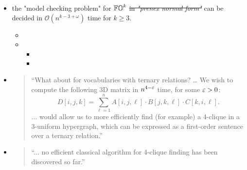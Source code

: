\begin{enumerate}
\begin{yoshiki}
\begin{itemize}
    \item the "model checking problem" for $\mathbb{FO}^{k}$  \sout{in \emph{"prenex normal form"}} can be decided in $\mathcal{O}(n^{k-3 + \omega})$ time for $k \ge 3$.
    \begin{itemize}
      \item {}
      \item {}
      \begin{itemize}
        \item {}
        \item {}
      \end{itemize}
    \end{itemize}
    \end{itemize}

    \begin{itemize}
      \item 
      \cite[Open Problem 2 (p.5)]{williamsFasterDecisionFirstorder2014}
      \begin{quotation}
        ``What about for vocabularies with ternary relations?
        \dots
        We wish to compute the following 3D matrix in $n^{4-\varepsilon}$ time,
        for some $\varepsilon > 0$:
      \[D[i, j, k] = \sum_{\ell = 1}^{n} A[i, j, \ell] \cdot B[j, k, \ell] \cdot C[k, i, \ell].\]
        ... would allow us to more efficiently find (for example) a 4-clique in a 3-uniform hypergraph,
        which can be expressed as a first-order sentence over a ternary relation.''
      \end{quotation}

      \item \cite{legallQuantumAlgorithmsFinding2016}
      \begin{quotation}
      ``... no efficient classical algorithm for 4-clique finding has been discovered
so far.'' 
      \end{quotation}
    \end{itemize}
  \end{yoshiki}


\end{enumerate}
